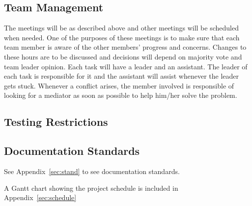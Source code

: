 \subsection{Team Management}
The meetings will be as described above and other meetings will be scheduled when needed. One of the purposes of these meetings is to make sure that each team member is aware of the other members' progress and concerns. Changes to these hours are to be discussed and decisions will depend on majority vote and team leader opinion. Each task will have a leader and an assistant. The leader of each task is responsible for it and the assistant will assist whenever the leader gets stuck. Whenever a conflict arises, the member involved is responsible of looking for a mediator as soon as possible to help him/her solve the problem. 

\subsection{Testing Restrictions}

\subsection{Documentation Standards}
See Appendix~\ref{sec:stand} to see documentation standards.

A Gantt chart showing the project schedule is included in Appendix~\ref{sec:schedule} 